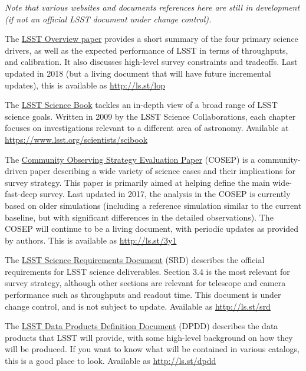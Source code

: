 \documentclass[DM,toc,usenatbib]{lsstdoc}
\begin{document}
{\it Note that various websites and documents references here are still in development (if not an official LSST document under change control).}

The \href{https://www.lsst.org/content/lsst-science-drivers-reference-design-and-anticipated-data-products}{LSST Overview paper} provides a short summary of the four primary science drivers, as well as the expected performance of LSST in terms of throughputs, and calibration. It also discusses high-level survey constraints and tradeoffs.  Last updated in 2018 (but a living document that will have future incremental updates), this is available as \url{http://ls.st/lop}

The \href{https://www.lsst.org/scientists/scibook}{LSST Science Book} tackles an in-depth view of a broad range of LSST science goals. Written in 2009 by the LSST Science Collaborations, each chapter focuses on investigations relevant to a different area of astronomy. Available at \url{https://www.lsst.org/scientists/scibook}

The \href{https://github.com/LSSTScienceCollaborations/ObservingStrategy}{Community Observing Strategy Evaluation Paper} (COSEP) is a community-driven paper describing a wide variety of science cases and their implications for survey strategy. This paper is primarily aimed at helping define the main wide-fast-deep survey. Last updated in 2017, the analysis in the COSEP is currently based on older simulations (including a reference simulation similar to the current baseline, but with significant differences in the detailed observations). The COSEP will continue to be a living document, with periodic updates as provided by authors. This is available as \url{http://ls.st/3y1}

The \href{http:/ls.st/srd}{LSST Science Requirements Document} (SRD) describes the official requirements for LSST science deliverables. Section 3.4 is the most relevant for survey strategy, although other sections are relevant for telescope and camera performance such as throughputs and readout time. This document is under change control, and is not subject to update. Available as \url{http://ls.st/srd}

The \href{http://ls.st/dpdd}{LSST Data Products Definition Document} (DPDD) describes the data products that LSST will provide, with some high-level background on how they will be produced. If you want to know what will be contained in various catalogs, this is a good place to look. Available as \url{http://ls.st/dpdd}
\end{document}
